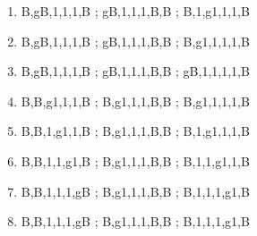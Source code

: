 \documentclass[leqno]{article}
\begin{document}
\begin{enumerate}
                    \item {}   {B,gB,1,1,1,B ; gB,1,1,1,B,B ; B,1,g1,1,1,B}
                    \item {}   {B,gB,1,1,1,B ; gB,1,1,1,B,B ; B,g1,1,1,1,B}
                    \item {}  {B,gB,1,1,1,B ; gB,1,1,1,B,B ; gB,1,1,1,1,B}
                    \item {}     {B,B,g1,1,1,B ; B,g1,1,1,B,B ; B,g1,1,1,1,B}
                    \item {}     {B,B,1,g1,1,B ; B,g1,1,1,B,B ; B,1,g1,1,1,B}
                    \item {}     {B,B,1,1,g1,B ; B,g1,1,1,B,B ; B,1,1,g1,1,B}
                    \item {}    {B,B,1,1,1,gB ; B,g1,1,1,B,B ; B,1,1,1,g1,B}
                    \item {}    {B,B,1,1,1,gB ; B,g1,1,1,B,B ; B,1,1,1,g1,B}
                \end{enumerate}
\end{document}
